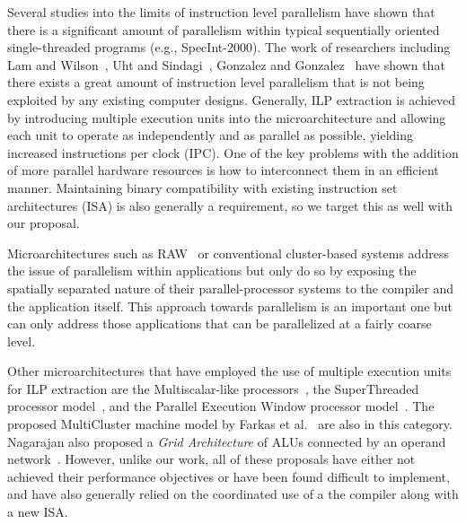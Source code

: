 \documentclass[10pt,twocolumn,dvips]{article}
\begin{document}
Several studies into the limits of instruction level 
parallelism have shown that there is 
a significant amount of parallelism within
typical sequentially oriented single-threaded programs
(e.g., SpecInt-2000).  
The work of researchers including 
Lam and Wilson~\cite{Lam92},
Uht and Sindagi~\cite{Uht95},
Gonzalez and Gonzalez~\cite{Gon97}
have shown that there exists a great amount of instruction level
parallelism that is not being exploited by any existing
computer designs.
Generally, ILP extraction is achieved by introducing multiple
execution units into the microarchitecture and allowing each unit
to operate as independently and as parallel as possible, yielding
increased instructions per clock (IPC).
One of the key problems with the addition of more parallel hardware
resources
is how to interconnect them in an efficient manner.
Maintaining binary compatibility with existing instruction
set architectures (ISA) is also generally a requirement, so we
target this as well with our proposal.

Microarchitectures such as RAW~\cite{waingold97,taylor02}
or conventional cluster-based systems
address the issue of parallelism within applications but only do so
by exposing the spatially separated nature of their
parallel-processor systems to the compiler and the application itself.
This approach towards parallelism is an important one but
can only address those applications that can be parallelized at
a fairly coarse level.

Other microarchitectures that have employed the
use of multiple execution units for ILP extraction are the Multiscalar-like
processors~\cite{Sohi95,sundararaman97multiscalar},
the SuperThreaded processor model~\cite{tsai96superthread},
and
the Parallel Execution Window processor model~\cite{kemp96pew}.
The proposed MultiCluster machine model by 
Farkas et al.~\cite{farkas97multicluster} are also in this category.
Nagarajan also proposed a {\em Grid Architecture} of ALUs
connected by an operand network~\cite{Nag01}.  
However, unlike our work, all of these proposals have either
not achieved their performance objectives or have been found
difficult to implement, and have also generally relied on the
coordinated use of a the compiler along with a new ISA.
\end{document}
